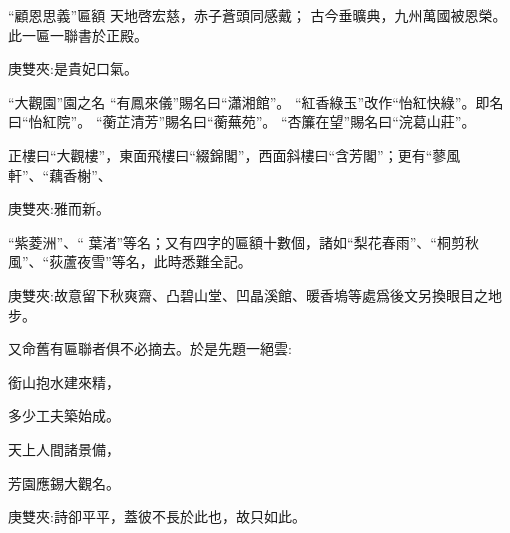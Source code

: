 \begin{qute}
    \begin{parag}
        “顧恩思義”匾額\newline
        天地啓宏慈，赤子蒼頭同感戴；\newline
        古今垂曠典，九州萬國被恩榮。\newline
        此一匾一聯書於正殿。\begin{note}庚雙夾:是貴妃口氣。\end{note}
    \end{parag}

    \begin{parag}
        “大觀園”園之名\newline
        “有鳳來儀”賜名曰“瀟湘館”。 \newline
        “紅香綠玉”改作“怡紅快綠”。即名曰“怡紅院”。\newline
        “蘅芷清芳”賜名曰“蘅蕪苑”。 \newline
        “杏簾在望”賜名曰“浣葛山莊”。 \newline
    \end{parag}
\end{qute}


\begin{parag}
    正樓曰“大觀樓”，東面飛樓曰“綴錦閣”，西面斜樓曰“含芳閣”；更有“蓼風軒”、“藕香榭”、\begin{note}庚雙夾:雅而新。\end{note}“紫菱洲”、“ 葉渚”等名；又有四字的匾額十數個，諸如“梨花春雨”、“桐剪秋風”、“荻蘆夜雪”等名，此時悉難全記。\begin{note}庚雙夾:故意留下秋爽齋、凸碧山堂、凹晶溪館、暖香塢等處爲後文另換眼目之地步。\end{note}又命舊有匾聯者俱不必摘去。於是先題一絕雲:
\end{parag}


\begin{poem}
    \begin{pl}銜山抱水建來精，\end{pl}

    \begin{pl}多少工夫築始成。\end{pl}

    \begin{pl}天上人間諸景備，\end{pl}

    \begin{pl}芳園應錫大觀名。\end{pl}
    \begin{note}庚雙夾:詩卻平平，蓋彼不長於此也，故只如此。\end{note}
\end{poem}


